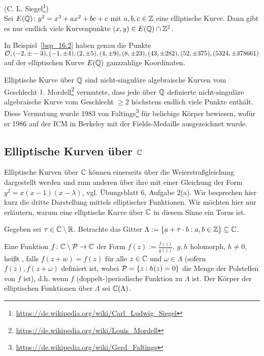 \begin{satz}
	(C. L. Siegel\footnote{\url{https://de.wikipedia.org/wiki/Carl_Ludwig_Siegel}}) \\
	Sei $E(\mathbb{Q})\colon y^2 = x^3 + ax^2 + bc + c$ mit $a,b,c \in \mathbb{Z}$ eine elliptische Kurve.
	Dann gibt es nur endlich viele Kurvenpunkte $(x,y) \in E(\mathbb{Q}) \cap \mathbb{Z}^2$. 
\end{satz}

\begin{bem}
	In Beispiel~\ref{bsp_16.2} haben genau die Punkte $\mathcal{O}, (-2,\pm -3), (-1,\pm 4), (2,\pm 5), (4,\pm 9), (8, \pm 23), (43,\pm 282), (52, \pm 375), (5324, \pm 378661)$ auf der elliptischen Kurve $E(\mathbb{Q})$ ganzzahlige Koordinaten.
\end{bem}

\begin{bem}
	Elliptische Kurve über $\mathbb{Q}$ sind nicht-singuläre algebraische Kurven vom Geschlecht $1$. Mordell\footnote{\url{https://de.wikipedia.org/wiki/Louis_Mordell}} vermutete, dass jede über $\mathbb{Q}$ definierte nicht-singuläre algebraische Kurve vom Geschlecht $\geq 2$ höchstens endlich viele Punkte enthält.
	Diese Vermutung wurde 1983 von Faltings\footnote{\url{https://de.wikipedia.org/wiki/Gerd_Faltings}} für beliebige Körper bewiesen, wofür er 1986 auf der ICM in Berkeley mit der Fields-Medaille ausgezeichnet wurde.
\end{bem}

\newpage
\subsection{Elliptische Kurven über $\mathbb{C}$}
\label{sub:3.2}
\begin{bem}
	Elliptische Kurven über $\mathbb{C}$ können einerseits über die Weierstraßgleichung dargestellt werden und zum anderen über ihre  mit einer Gleichung der Form $y^2 = x(x-1)(x-\lambda)$, vgl. Übungsblatt 6, Aufgabe 2(a).
	Wir besprechen hier kurz die dritte Darstellung mittels elliptischer Funktionen.
	Wir möchten hier nur erläutern, warum eine elliptische Kurve über $\mathbb{C}$ in diesem Sinne ein Torus ist.
	
	Gegeben sei $\tau \in \mathbb{C} \setminus \mathbb{R}$. Betrachte das Gitter $\Lambda := \{ a + \tau \cdot b : a,b \in \mathbb{Z}\} \subseteq \mathbb{C}$.	
\end{bem}

\begin{defn}
	Eine Funktion $f\colon \mathbb{C} \setminus \mathcal{P} \rightarrow \mathbb{C}$ der Form $f(z) := \frac{f(z)}{g(z)}$, $g,h$ holomorph, $h \neq 0$, heißt , falls $f(z+w) = f(z)$ für alle $z \in \mathbb{C}$ und $\omega \in \Lambda$ (sofern $f(z), f(z+\omega)$ definiert ist, wobei $\mathcal{P} = \{z : h(z) = 0\}$ die Menge der Polstellen von $f$ ist), d.h. wenn $f$ (doppelt-)periodische Funktion zu $\Lambda$ ist.
	Der Körper der elliptischen Funktionen über $\Lambda$ sei $\mathbb{C}(\Lambda)$.
\end{defn}


